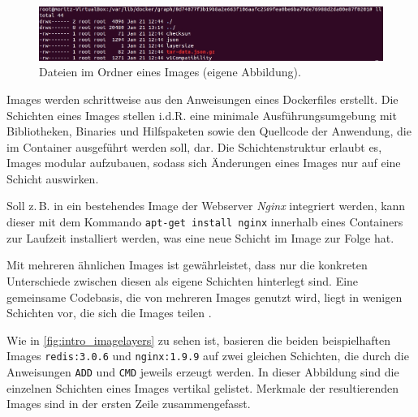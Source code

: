 \documentclass[../main.tex]{subfiles}
\begin{document}
			\begin{figure}[!htbp]
          \centering
          \includegraphics[width=1.0\textwidth]{./images/intro_dockerImageVZ.jpg}
          \caption{Dateien im Ordner eines Images (eigene Abbildung).}
          \label{fig:intro_dockerImageVZ}
      \end{figure}

			Images werden schrittweise aus den Anweisungen eines Dockerfiles erstellt. Die Schichten eines Images stellen i.d.R. eine minimale Ausführungsumgebung mit Bibliotheken, Binaries und Hilfspaketen sowie den Quellcode der Anwendung, die im Container ausgeführt werden soll, dar. Die Schichtenstruktur erlaubt es, Images modular aufzubauen, sodass sich Änderungen eines Images nur auf eine Schicht auswirken.

			Soll z.\,B. in ein bestehendes Image der Webserver \emph{Nginx} integriert werden, kann dieser mit dem Kommando \texttt{apt-get install nginx} innerhalb eines Containers zur Laufzeit installiert werden, was eine neue Schicht im Image zur Folge hat.

			Mit mehreren ähnlichen Images ist gewährleistet, dass nur die konkreten Unterschiede zwischen diesen als eigene Schichten hinterlegt sind. Eine gemeinsame Codebasis, die von mehreren Images genutzt wird, liegt in wenigen Schichten vor, die sich die Images teilen \cite[S.3]{dockerIntroIEEE}.

			Wie in \fig \ref{fig:intro_imagelayers} zu sehen ist, basieren die beiden beispielhaften Images \texttt{redis:3.0.6} und \texttt{nginx:1.9.9} auf zwei gleichen Schichten, die durch die Anweisungen \texttt{ADD} und \texttt{CMD} jeweils erzeugt werden. In dieser Abbildung sind die einzelnen Schichten eines Images vertikal gelistet. Merkmale der resultierenden Images sind in der ersten Zeile zusammengefasst.
\end{document}
